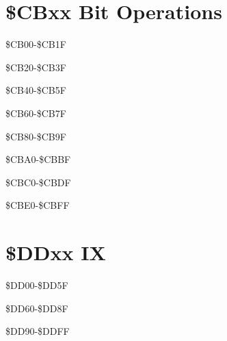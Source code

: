 \section{\$CBxx Bit Operations}
\begin{table}[h]\centering\scriptsize
  \caption{\$CB00-\$CB1F}
\end{table}
\begin{table}[h]\centering\scriptsize
  \caption{\$CB20-\$CB3F}
\end{table}
\begin{table}[h]\centering\scriptsize
  \caption{\$CB40-\$CB5F}
\end{table}
\begin{table}[h]\centering\scriptsize
  \caption{\$CB60-\$CB7F}
\end{table}
\begin{table}[h]\centering\scriptsize
  \caption{\$CB80-\$CB9F}
\end{table}
\begin{table}[h]\centering\scriptsize
  \caption{\$CBA0-\$CBBF}
\end{table}
\begin{table}[h]\centering\scriptsize
  \caption{\$CBC0-\$CBDF}
\end{table}
\begin{table}[h]\centering\scriptsize
  \caption{\$CBE0-\$CBFF}
\end{table}
\section{\$DDxx IX}
\begin{table}[h]\centering\scriptsize
  \caption{\$DD00-\$DD5F}
\end{table}
\begin{table}[h]\centering\scriptsize
  \caption{\$DD60-\$DD8F}
\end{table}
\begin{table}[h]\centering\scriptsize
  \caption{\$DD90-\$DDFF}
\end{table}
